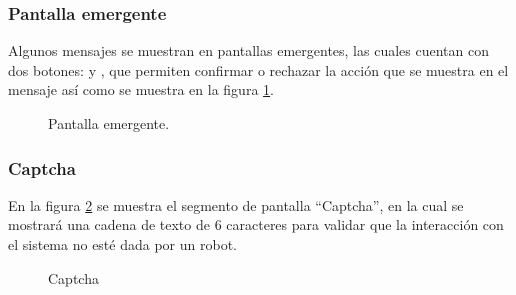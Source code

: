   \subsubsection{Pantalla emergente}
    Algunos mensajes se muestran en pantallas emergentes, las cuales cuentan con dos botones:  y , que permiten confirmar o  rechazar la acción que se muestra en el mensaje así como se muestra en la figura \ref{fig:pantallaEmergente}.
      \begin{figure}[htbp!]
	\begin{center}
	  \caption{Pantalla emergente.}
	  \label{fig:pantallaEmergente}
	\end{center}
      \end{figure}
  

      \subsubsection{Captcha}
      \label{ch:Interaccion:Captcha}

      En la figura \ref{fig:captcha} se muestra el segmento de pantalla ``Captcha'', en la cual se mostrará una cadena de texto de 6 caracteres  para validar que la interacción con el sistema no esté dada por un robot.
      \begin{figure}[htbp!]
	  \begin{center}
	      \caption{Captcha}
	      \label{fig:captcha}
	  \end{center}
      \end{figure}

